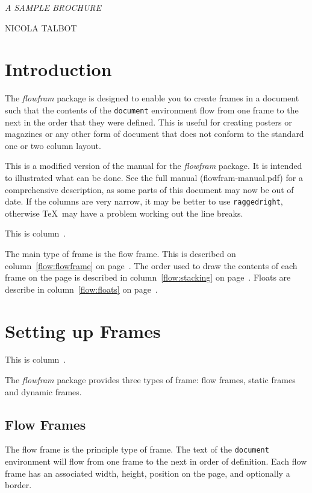 \documentclass[a4paper]{report}
\providecommand{\env}[1]{\texttt{#1}}
\providecommand{\cmdname}[1]{\texttt{\symbol{92}#1}}
\begin{document}

{\noindent
\slshape\Huge\MakeUppercase{A Sample Brochure}\par
\vskip0.5in
\noindent\large\MakeUppercase{Nicola Talbot}\\
}


\chapter{Introduction}

The \textsl{flowfram} package is designed to enable you to create
frames in a document such that the 
contents of the \env{document} environment flow from one 
frame to the next in the order that they were defined.  
This is useful for creating posters
or magazines or any other form of document that does not 
conform to the standard one or two column layout.

This is a modified version of the manual for the \textsl{flowfram} package.
It is intended to illustrated what can be done. See the full 
manual (flowfram-manual.pdf) for
a comprehensive description, as some parts of this document
may now be out of date.
If the columns are very narrow, it may be better to
use \cmdname{raggedright}, otherwise \TeX\ may have a
problem working out the line breaks.

This is column~\thedisplayedframe.

The main type of frame is the flow frame. This is described on
column~\ref{flow:flowframe} on page~\pageref{flow:flowframe}.
The order used to draw the contents of each frame on the page
is described in column~\ref{flow:stacking} on 
page~\pageref{flow:stacking}. Floats are describe in 
column~\ref{flow:floats} on page~\pageref{flow:floats}.

\chapter{Setting up Frames}

This is column~\thedisplayedframe.

The \textsl{flowfram} package provides three types of frame:
{flow frames}, {static 
frames} and {dynamic frames}.

\section*{Flow Frames}

The flow frame is the principle type of frame.
The text of the \env{document} environment will flow from 
one frame to the next in order of definition. Each 
flow frame has an associated width, height, 
position on the page, and optionally a border.
\end{document}
